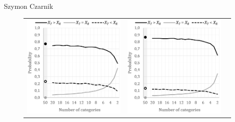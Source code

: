 \begin{artengenv}{Szymon Czarnik}
\begin{figure}[H]
\begin{small}
\begin{supertabular}{m{.32\textwidth}m{.32\textwidth}m{.32\textwidth}}
   \includegraphics[width=\linewidth]{ART_Czarnik/Czarnik-img017.jpg} &
   \includegraphics[width=\linewidth]{ART_Czarnik/Czarnik-img018.jpg} \\

\end{supertabular}
\end{small}
\end{figure}
\end{artengenv}
